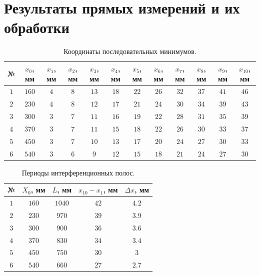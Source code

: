\documentclass{article}
\begin{document}
\section{Результаты прямых измерений и их обработки}
\begin{table}[h]
    \centering
    \bgroup
    \def\arraystretch{1.4}
    \begin{tabular}{|c|c|c|c|c|c|c|c|c|c|c|c|}
        \hline
        № & $x_{0}$, мм & $x_{1}$, мм & $x_{2}$, мм & $x_{3}$, мм & $x_{4}$, мм & $x_{5}$, мм & $x_{6}$, мм & $x_{7}$, мм & $x_{8}$, мм & $x_{9}$, мм & $x_{10}$, мм \\ \hline
        $ 1 $ & $ 160 $ & $ 4 $ & $ 8 $ & $ 13 $ & $ 18 $ & $ 22 $ & $ 26 $ & $ 32 $ & $ 37 $ & $ 41 $ & $ 46 $\\ \hline
        $ 2 $ & $ 230 $ & $ 4 $ & $ 8 $ & $ 12 $ & $ 17 $ & $ 21 $ & $ 24 $ & $ 30 $ & $ 34 $ & $ 39 $ & $ 43 $\\ \hline
        $ 3 $ & $ 300 $ & $ 3 $ & $ 7 $ & $ 11 $ & $ 16 $ & $ 19 $ & $ 22 $ & $ 28 $ & $ 31 $ & $ 35 $ & $ 39 $\\ \hline
        $ 4 $ & $ 370 $ & $ 3 $ & $ 7 $ & $ 11 $ & $ 15 $ & $ 18 $ & $ 22 $ & $ 26 $ & $ 30 $ & $ 33 $ & $ 37 $\\ \hline
        $ 5 $ & $ 450 $ & $ 3 $ & $ 7 $ & $ 10 $ & $ 13 $ & $ 17 $ & $ 20 $ & $ 24 $ & $ 27 $ & $ 30 $ & $ 33 $\\ \hline
        $ 6 $ & $ 540 $ & $ 3 $ & $ 6 $ & $ 9 $ & $ 12 $ & $ 15 $ & $ 18 $ & $ 21 $ & $ 24 $ & $ 27 $ & $ 30 $\\ \hline
    \end{tabular}
    \egroup
    \caption{Координаты последовательных минимумов.} 
\end{table}
\begin{table}[h]
    \centering
    \bgroup
    \def\arraystretch{1.4}
    \begin{tabular}{|c|c|c|c|c|}
        \hline
        № & $X_{0}$, мм & $L$, мм & $x_{10}-x_{1}$, мм & $\Delta x$, мм\\ \hline
        $1$ & $ 160 $ & $ 1040 $ & $ 42 $ & $ 4.2 $\\ \hline
        $2$ & $ 230 $ & $ 970 $ & $ 39 $ & $ 3.9 $\\ \hline
        $3$ & $ 300 $ & $ 900 $ & $ 36 $ & $ 3.6 $\\ \hline
        $4$ & $ 370 $ & $ 830 $ & $ 34 $ & $ 3.4 $\\ \hline
        $5$ & $ 450 $ & $ 750 $ & $ 30 $ & $ 3 $\\ \hline
        $6$ & $ 540 $ & $ 660 $ & $ 27 $ & $ 2.7 $\\ \hline
    \end{tabular}
    \egroup
    \caption{Периоды интерференционных полос.} 
\end{table}
\newpage
\end{document}
